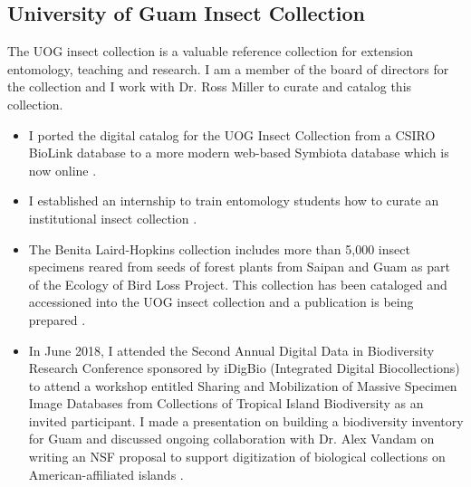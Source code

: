 \subsection{University of Guam Insect Collection}
\begin{refsection}

The UOG insect collection is a valuable reference collection for extension
entomology, teaching and research. I am a member of the board of directors
for the collection and I work with Dr. Ross Miller to curate and catalog
this collection.

\activities

\begin{itemize}

\item I ported the digital catalog for the UOG Insect Collection from a
CSIRO BioLink database to a more modern web-based Symbiota database
which is now online \cite{moore_scan_2018}.

\item I established an internship to train entomology students how to curate
an institutional insect collection \cite{moore_internship_2018}.

\item The Benita Laird-Hopkins collection includes more than 5,000 insect
specimens reared from seeds of forest plants from Saipan and Guam
as part of the Ecology of Bird Loss Project. This collection has been
cataloged and accessioned into the UOG insect collection and a publication
is being prepared \cite{laird-hopkins_[preparation]_2018}.

\item In June 2018, I attended the Second Annual Digital Data in Biodiversity
Research Conference sponsored by iDigBio (Integrated Digital Biocollections)
to attend a workshop entitled Sharing and Mobilization of Massive
Specimen Image Databases from Collections of Tropical Island Biodiversity
as an invited participant. I made a presentation on building a biodiversity
inventory for Guam \cite{moore_building_2018-1} and discussed ongoing
collaboration with Dr. Alex Vandam on writing an NSF proposal to support
digitization of biological collections on American-affiliated islands
\cite{moore_trip_2018}.
\end{itemize}

\plans

\printbibliography[heading=none]

\end{refsection}

